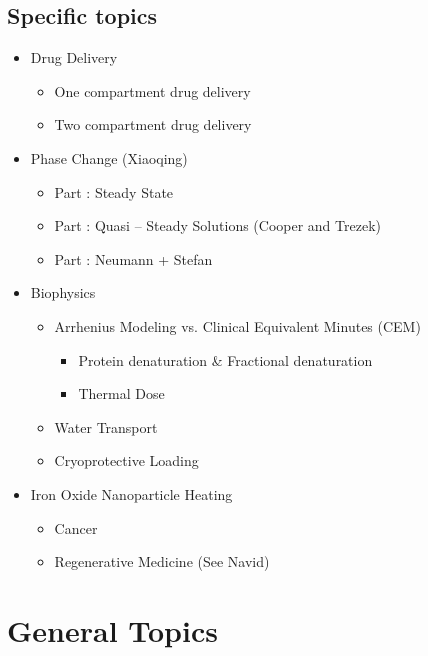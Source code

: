 \begin{appendices}
\section*{Specific topics \uppercase\expandafter{}}
\begin{itemize}
\item Drug Delivery
\begin{itemize}
\item One compartment drug delivery
\item Two compartment drug delivery
\end{itemize}
\item Phase Change (Xiaoqing)
	\begin{itemize}
	\item Part \uppercase\expandafter{}: Steady State
	\item Part \uppercase\expandafter{}: Quasi – Steady Solutions (Cooper and Trezek)
	\item Part \uppercase\expandafter{}: Neumann + Stefan
	\end{itemize}
\item Biophysics
	\begin{itemize}
	\item Arrhenius Modeling vs. Clinical Equivalent Minutes (CEM)
		\begin{itemize}
		\item Protein denaturation \& Fractional denaturation
		\item Thermal Dose
		\end{itemize}
	\item Water Transport
	\item Cryoprotective Loading
	\end{itemize}
\item Iron Oxide Nanoparticle Heating
	\begin{itemize}
	\item Cancer
	\item Regenerative Medicine (See Navid)
	\end{itemize}

\end{itemize}





\chapter{General Topics}


\end{appendices}

